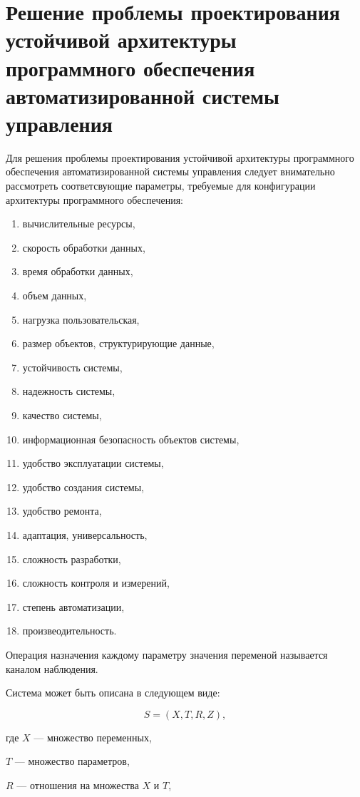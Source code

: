 \section{Решение проблемы проектирования устойчивой архитектуры программного обеспечения автоматизированной системы управления}\label{sec:ch2/sec2}
Для решения проблемы проектирования устойчивой архитектуры программного обеспечения автоматизированной системы управления следует внимательно рассмотреть соответсвующие параметры, требуемые для конфигурации архитектуры программного обеспечения:
\begin{enumerate}
	\item вычислительные ресурсы,
	\item скорость обработки данных,
	\item время обработки данных,
	\item объем данных,
	\item нагрузка пользовательская,
	\item размер объектов, структурирующие данные,
	\item устойчивость системы, 
	\item надежность системы,
	\item качество системы,
	\item информационная безопасность объектов системы,
	\item удобство эксплуатации системы,
	\item удобство создания системы,
	\item удобство ремонта,
	\item адаптация, универсальность,
	\item сложность разработки,
	\item сложность контроля и измерений,
	\item степень автоматизации,
	\item произвеодительность.
\end{enumerate}


Операция назначения каждому параметру значения переменой называется каналом наблюдения.

Система может быть описана в следующем виде:

\begin{equation}
    \label{eq:equation29}
    S =  (X, T, R, Z ) ,
\end{equation}

где $ X $  — множество переменных, 

$T$ — множество параметров, 

$R$ — отношения на множества $X$ и $T$, 

